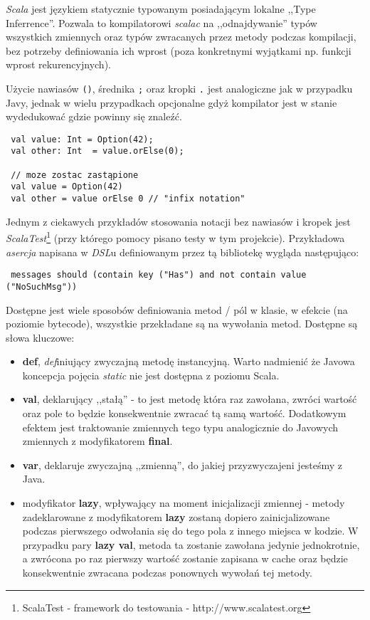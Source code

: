 \textit{Scala} jest językiem statycznie typowanym posiadającym lokalne ,,Type Inferrence''. Pozwala to kompilatorowi 
\textit{scalac} na ,,odnajdywanie'' typów wszystkich zmiennych oraz typów zwracanych przez metody podczas kompilacji,
bez potrzeby definiowania ich wprost (poza konkretnymi wyjątkami np. funkcji wprost rekurencyjnych).

Użycie nawiasów \verb|()|, średnika \verb|;| oraz kropki \verb|.| jest analogiczne jak w przypadku Javy, 
jednak w wielu przypadkach opcjonalne gdyż kompilator jest w stanie wydedukować gdzie powinny się znaleźć.

\begin{lstlisting}
 val value: Int = Option(42);
 val other: Int  = value.orElse(0);

 // moze zostac zastąpione
 val value = Option(42)
 val other = value orElse 0 // "infix notation"
\end{lstlisting}

Jednym z ciekawych przykładów stosowania notacji bez nawiasów i kropek jest \textit{ScalaTest}\footnote{ScalaTest - framework do testowania - http://www.scalatest.org}
(przy którego pomocy pisano testy w tym projekcie). Przykładowa \textit{asercja} napisana w \textit{DSL}u definiowanym przez tą bibliotekę wygląda następująco:
\begin{lstlisting}
 messages should (contain key ("Has") and not contain value ("NoSuchMsg"))
\end{lstlisting}

Dostępne jest wiele sposobów definiowania metod / pól w klasie,
w efekcie (na poziomie bytecode), wszystkie przekładane są na wywołania metod. Dostępne są słowa kluczowe:
\begin{itemize}
 \item \textbf{def}, \textit{def}iniujący zwyczajną metodę instancyjną. Warto nadmienić że Javowa koncepcja pojęcia \textit{static} nie jest dostępna z poziomu Scala.
 \item \textbf{val}, deklarujący ,,stałą'' - to jest metodę która raz zawołana, zwróci wartość oraz pole to będzie konsekwentnie zwracać tą samą wartość. 
              Dodatkowym efektem jest traktowanie zmiennych tego typu analogicznie do Javowych zmiennych z modyfikatorem \textbf{final}.
 \item \textbf{var}, deklaruje zwyczajną ,,zmienną'', do jakiej przyzwyczajeni jesteśmy z Java.
 \item modyfikator \textbf{lazy}, wpływający na moment inicjalizacji zmiennej - metody zadeklarowane z modyfikatorem \textbf{lazy} 
       zostaną dopiero zainicjalizowane podczas pierwszego odwołania się do tego pola z innego miejsca w kodzie. 
       W przypadku pary \textbf{lazy val}, metoda ta zostanie zawołana jedynie jednokrotnie, a zwrócona po raz pierwszy wartość
       zostanie zapisana w cache oraz będzie konsekwentnie zwracana podczas ponownych wywołań tej metody.
\end{itemize}

